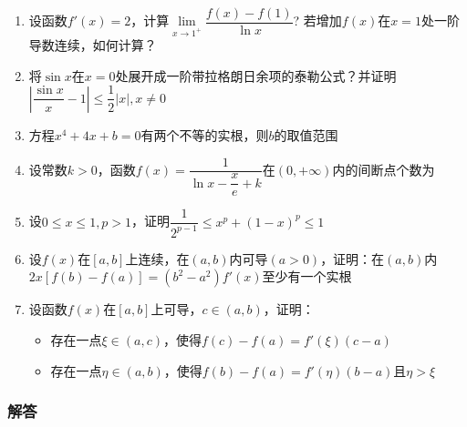 \documentclass[./book.tex]{subfiles}
\begin{document}
\begin{enumerate}
\begin{enumerate}
            \item A. $\lim\limits_{x\to +\infty}[f(2x) + f(x)] = 0$
            \item A. $\lim\limits_{x\to +\infty}[f(2x) - f(x)] = 0$
            \item A. $\lim\limits_{x\to +\infty}[f(x+1) - f(x)] = 0$
            \item A. $\lim\limits_{x\to +\infty}[f(x+1) + f(x)] = 0$
        \end{enumerate}
        \item 设函数$f'(x) = 2$，计算$\lim\limits_{x\to 1^+} \dfrac{f(x) - f(1)}{\ln x}$? 若增加$f(x)$在$x = 1$处一阶导数连续，如何计算？
        \item 将$\sin x$在$x = 0$处展开成一阶带拉格朗日余项的泰勒公式？并证明$|\dfrac{\sin x}{x} - 1| \leq \dfrac{1}{2}|x|, x\neq 0$
        \item 方程$x^4 + 4x + b = 0$有两个不等的实根，则$b$的取值范围
        \item 设常数$k > 0$，函数$f(x) = \dfrac{1}{\ln x - \dfrac{x}{e} + k}$在$(0, +\infty)$内的间断点个数为
        \item 设$0 \leq x \leq 1, p > 1$，证明$\dfrac{1}{2^{p-1}} \leq x^p + (1-x)^p \leq 1$
        \item 设$f(x)$在$[a, b]$上连续，在$(a, b)$内可导$(a > 0)$，证明：在$(a , b)$内$2x[f(b) - f(a)] = (b^2 - a^2)f'(x)$至少有一个实根
        \item 设函数$f(x)$在$[a, b]$上可导，$c \in (a, b)$，证明：
        \begin{itemize}
            \item 存在一点$\xi \in (a, c)$，使得$f(c) - f(a) = f'(\xi)(c - a)$
            \item 存在一点$\eta \in (a, b)$，使得$f(b) - f(a) = f'(\eta)(b - a)$且$\eta > \xi$
        \end{itemize}
    \end{enumerate}

    \subsubsection{解答}
\end{document}
